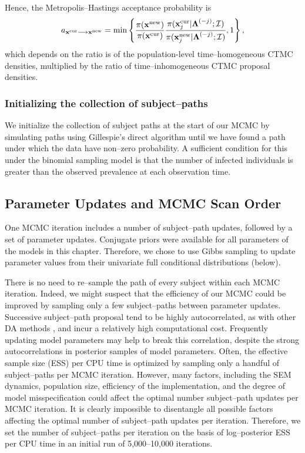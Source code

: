Hence, the Metropolis--Hastings acceptance probability is
\begin{equation*}
a_{\mathbf{x}^{\mathrm{cur}} \longrightarrow\mathbf{x}^{\mathrm{new}}}=\min \left \lbrace  \frac{\pi(\mathbf{x}^{\mathrm{new}})}{\pi(\mathbf{x}^{\mathrm{cur}})}\frac{\pi(\mathbf{x}^{\mathrm{cur}}_j| \boldsymbol{\Lambda}^{(-j)}; \mathcal{I})}{\pi(\mathbf{x}^{\mathrm{new}}_j| \boldsymbol{\Lambda}^{(-j)}; \mathcal{I})} , 1 \right \rbrace, 
\end{equation*}
which depends on the ratio is of the population-level time--homogeneous CTMC densities, multiplied by the ratio of time--inhomogeneous CTMC proposal densities. 

\subsubsection{Initializing the collection of subject--paths}
We initialize the collection of subject paths at the start of our MCMC by simulating paths using Gillespie's direct algorithm \cite{gillespie1976general} until we have found a path under which the data have non--zero probability. 
A sufficient condition for this under the binomial sampling model is that the number of infected individuals is greater than the observed prevalence at each observation time. 

\subsection{Parameter Updates and MCMC Scan Order}
\label{subsec:bda_mcmc_scan}
One MCMC iteration includes a number of subject--path updates, followed by a set of parameter updates. Conjugate priors were available for all parameters of the models in this chapter. Therefore, we chose to use Gibbs sampling to update parameter values from their univariate full conditional distributions (below).

There is no need to re--sample the path of every subject within each MCMC iteration. Indeed, we might suspect that the efficiency of our MCMC could be improved by sampling only a few subject--paths between parameter updates. Successive subject--path proposal tend to be highly autocorrelated, as with other DA methods \cite{roberts2001}, and incur a relatively high computational cost. Frequently updating model parameters may help to break this correlation, despite the strong autocorrelations in posterior samples of model parameters. Often, the effective sample size (ESS) per CPU time is optimized by sampling only a handful of subject--paths per MCMC iteration. However, many factors, including the SEM dynamics, population size, efficiency of the implementation, and the degree of model misspecification could affect the optimal number subject--path updates per MCMC iteration. It is clearly impossible to disentangle all possible factors affecting the optimal number of subject--path updates per iteration. Therefore, we set the number of subject--paths per iteration on the basis of log--posterior ESS per CPU time in an initial run of 5,000--10,000 iterations.

